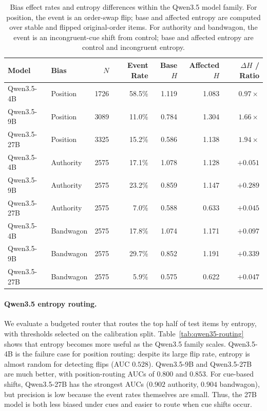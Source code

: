 \begin{table}[t]
\centering
\small
\setlength{\tabcolsep}{5pt}
\renewcommand{\arraystretch}{1.08}
\begin{tabular}{llrrrrr}
\toprule
Model & Bias & $N$ & Event Rate & Base $H$ & Affected $H$ & $\Delta H$ / Ratio \\
\midrule
Qwen3.5-4B  & Position  & 1726 & 58.5\% & 1.119 & 1.083 & $0.97\times$ \\
Qwen3.5-9B  & Position  & 3089 & 11.0\% & 0.784 & 1.304 & $1.66\times$ \\
Qwen3.5-27B & Position  & 3325 & 15.2\% & 0.586 & 1.138 & $1.94\times$ \\
Qwen3.5-4B  & Authority & 2575 & 17.1\% & 1.078 & 1.128 & $+0.051$ \\
Qwen3.5-9B  & Authority & 2575 & 23.2\% & 0.859 & 1.147 & $+0.289$ \\
Qwen3.5-27B & Authority & 2575 &  7.0\% & 0.588 & 0.633 & $+0.045$ \\
Qwen3.5-4B  & Bandwagon & 2575 & 17.8\% & 1.074 & 1.171 & $+0.097$ \\
Qwen3.5-9B  & Bandwagon & 2575 & 29.7\% & 0.852 & 1.191 & $+0.339$ \\
Qwen3.5-27B & Bandwagon & 2575 &  5.9\% & 0.575 & 0.622 & $+0.047$ \\
\bottomrule
\end{tabular}
\caption{Bias effect rates and entropy differences within the Qwen3.5 model
family. For position, the event is an order-swap flip; base and affected
entropy are computed over stable and flipped original-order items. For
authority and bandwagon, the event is an incongruent-cue shift from control;
base and affected entropy are control and incongruent entropy.}
\label{tab:qwen35-bias-results}
\end{table}

\paragraph{Qwen3.5 entropy routing.}
We evaluate a budgeted router that routes the top half of test items by entropy,
with thresholds selected on the calibration split. Table~\ref{tab:qwen35-routing}
shows that entropy becomes more useful as the Qwen3.5 family scales. Qwen3.5-4B
is the failure case for position routing: despite its large flip rate, entropy
is almost random for detecting flips (AUC $0.528$). Qwen3.5-9B and Qwen3.5-27B
are much better, with position-routing AUCs of $0.800$ and $0.853$. For
cue-based shifts, Qwen3.5-27B has the strongest AUCs ($0.902$ authority,
$0.904$ bandwagon), but precision is low because the event rates themselves are
small. Thus, the 27B model is both less biased under cues and easier to route
when cue shifts occur.


